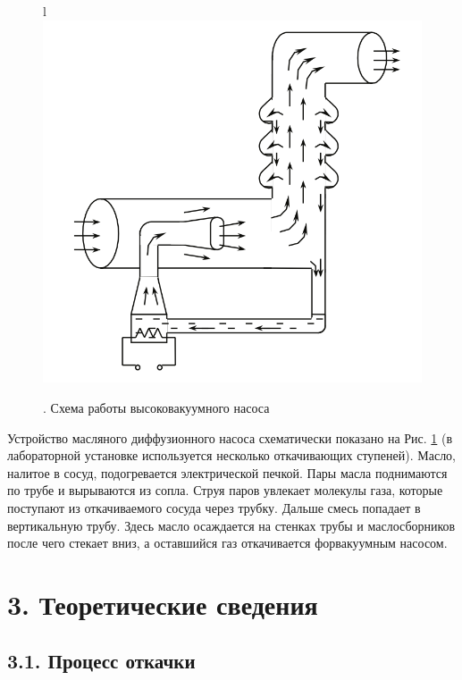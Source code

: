 \documentclass[a4paper]{article}
\begin{document}
\begin{figure}{l}
		\centering
		\includegraphics[scale=0.4]{pump.jpg}
		\caption{. Схема работы высоковакуумного насоса}\label{pump}
	\end{figure}

Устройство масляного диффузионного насоса схематически показано на Рис. \ref{pump} (в лабораторной установке используется несколько откачивающих ступеней). Масло, налитое в сосуд, подогревается электрической печкой. Пары масла поднимаются по трубе и вырываются из сопла. Струя паров увлекает молекулы газа, которые поступают из откачиваемого сосуда через трубку. Дальше смесь попадает в вертикальную трубу. Здесь масло осаждается на стенках трубы и маслосборников после чего стекает вниз, а оставшийся газ откачивается форвакуумным насосом. 
	
\section*{3. Теоретические сведения}
\subsection*{3.1. Процесс откачки}
	
\end{document}
